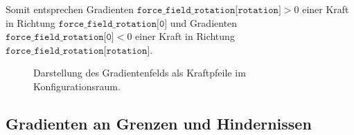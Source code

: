 Somit entsprechen Gradienten $ \texttt{force\_field\_rotation[rotation]} > 0 $ einer Kraft in Richtung $\texttt{force\_field\_rotation[0]}$ und Gradienten $ \texttt{force\_field\_rotation[0]} < 0 $ einer Kraft in Richtung $\texttt{force\_field\_rotation[rotation]}$.

\begin{figure}[h!]
	\centering
	\footnotesize
	\centerline{}
	\caption{Darstellung des Gradientenfelds als Kraftpfeile im Konfigurationsraum.}
\end{figure}

\subsection{Gradienten an Grenzen und Hindernissen}

